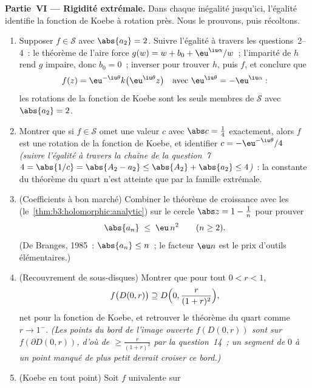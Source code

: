 \begin{problem}
\medskip
\noindent\textbf{Partie~VI --- Rigidité extrémale.} Dans
chaque inégalité jusqu'ici, l'égalité identifie la fonction
de Koebe à rotation près. Nous le prouvons, puis récoltons.
\begin{enumerate}[resume]
  \item Supposer $f \in \mathcal S$ avec $\abs{a_2} = 2$.
        Suivre l'égalité à travers les questions~2--4~: le
        théorème de l'aire force $g(w) = w + b_0 +
        \eu^{\iu\alpha}/w$~; l'imparité de $h$ rend $g$
        impaire, donc $b_0 = 0$~; inverser pour trouver $h$,
        puis $f$, et conclure que
        \[
        f(z) = \eu^{-\iu\theta}k\bigl(\eu^{\iu\theta}z\bigr)
        \quad\text{avec } \eu^{\iu\theta} =
        -\eu^{\iu\alpha} :
        \]
        les rotations de la fonction de Koebe sont les seuls
        membres de $\mathcal S$ avec $\abs{a_2} = 2$.
  \item Montrer que si $f \in \mathcal S$ omet une valeur $c$
        avec $\abs c = \frac14$ exactement, alors $f$ est
        une rotation de la fonction de Koebe, et identifier
        $c = -\eu^{-\iu\theta}/4$ \emph{(suivre l'égalité à
        travers la chaîne de la question~7 $4 = \abs{1/c} =
        \abs{A_2 - a_2} \leq \abs{A_2} + \abs{a_2} \leq
        4$)}~: la constante du théorème du quart n'est
        atteinte que par la famille extrémale.
  \item (Coefficients à bon marché) Combiner le théorème de
        croissance avec les 
        (le~\cref{thm:b3:holomorphic:analytic}) sur le
        cercle $\abs z = 1 - \frac1n$ pour prouver
        \[
        \abs{a_n} \;\leq\; \eu\,n^2 \qquad (n \geq 2) .
        \]
        (De Branges, 1985~: $\abs{a_n} \leq n$~; le facteur
        $\eu n$ est le prix d'outils élémentaires.)
  \item (Recouvrement de sous-disques) Montrer que pour tout
        $0 < r < 1$,
        \[
        f\bigl(D(0, r)\bigr) \supseteq
        D\Bigl(0, \frac{r}{(1 + r)^2}\Bigr),
        \]
        net pour la fonction de Koebe, et retrouver le
        théorème du quart comme $r \to 1^-$. \emph{(Les
        points du bord de l'image ouverte $f(D(0,r))$ sont
        sur $f(\partial D(0,r))$, d'où de  $\geq
        \frac{r}{(1+r)^2}$ par la question~14~; un segment
        de $0$ à un point manqué de plus petit 
        devrait croiser ce bord.)}
  \item (Koebe en tout point) Soit $f$ univalente sur

\end{enumerate}
\end{problem}
